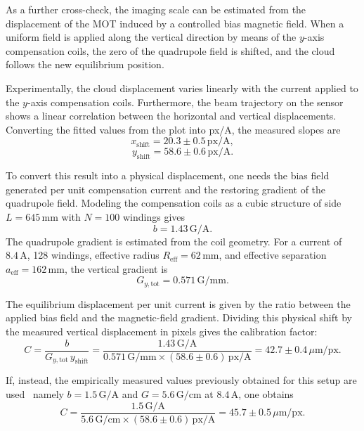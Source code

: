 \begin{enumerate}
As a further cross-check, the imaging scale can be estimated from the displacement of the MOT induced by a controlled bias magnetic field. When a uniform field is applied along the vertical direction by means of the $y$-axis compensation coils, the zero of the quadrupole field is shifted, and the cloud follows the new equilibrium position.

Experimentally, the cloud displacement varies linearly with the current applied to the $y$-axis compensation coils. Furthermore, the beam trajectory on the sensor shows a linear correlation between the horizontal and vertical displacements. Converting the fitted values from the plot into px/A, the measured slopes are
\begin{equation}
    x_{\mathrm{shift}} = 20.3 \pm 0.5\,\mathrm{px/A},
\end{equation}
\begin{equation}
    y_{\mathrm{shift}} = 58.6 \pm 0.6\,\mathrm{px/A}.
\end{equation}

To convert this result into a physical displacement, one needs the bias field generated per unit compensation current and the restoring gradient of the quadrupole field. Modeling the compensation coils as a cubic structure of side $L = 645\,\mathrm{mm}$ with $N = 100$ windings gives
\begin{equation}
    b = 1.43\,\mathrm{G/A}.
\end{equation}
The quadrupole gradient is estimated from the coil geometry. For a current of $8.4\,\mathrm{A}$, 128 windings, effective radius $R_{\mathrm{eff}} = 62\,\mathrm{mm}$, and effective separation $a_{\mathrm{eff}} = 162\,\mathrm{mm}$, the vertical gradient is
\begin{equation}
    G_{y,\mathrm{tot}} = 0.571\,\mathrm{G/mm}.
\end{equation}

The equilibrium displacement per unit current is given by the ratio between the applied bias field and the magnetic-field gradient. Dividing this physical shift by the measured vertical displacement in pixels gives the calibration factor:
\begin{equation}
    C = \frac{b}{G_{y,\mathrm{tot}}\,y_{\mathrm{shift}}}
    = \frac{1.43\,\mathrm{G/A}}{0.571\,\mathrm{G/mm}\times (58.6 \pm 0.6)\,\mathrm{px/A}}
    = 42.7 \pm 0.4\,\mu\mathrm{m/px}.
\end{equation}

If, instead, the empirically measured values previously obtained for this setup are used~\cite{Marchesini} namely $b = 1.5\,\mathrm{G/A}$ and $G = 5.6\,\mathrm{G/cm}$ at $8.4\,\mathrm{A}$, one obtains
\begin{equation}
    C = \frac{1.5\,\mathrm{G/A}}{5.6\,\mathrm{G/cm}\times (58.6 \pm 0.6)\,\mathrm{px/A}} = 45.7 \pm 0.5\,\mu\mathrm{m/px}.
\end{equation}


\end{enumerate}
